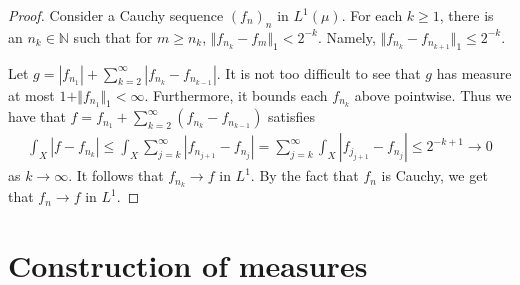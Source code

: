 \documentclass[11pt]{amsart}
\theoremstyle{definition}
\numberwithin{equation}{section}
\begin{document}
\begin{proof}
    Consider a Cauchy sequence $(f_n)_n$ in $L^1(\mu)$. For each $k\ge 1$, there is an $n_k\in\mathbb N$ such that for $m\ge n_k$, $\Vert f_{n_k}-f_m\Vert_1<2^{-k}$. Namely, $\Vert f_{n_k}-f_{n_{k+1}}\Vert_1\le2^{-k}$.

    Let $g=|f_{n_1}|+\sum_{k=2}^\infty|f_{n_k}-f_{n_{k-1}}|$. It is not too difficult to see that $g$ has measure at most $1+\Vert f_{n_1}\Vert_1<\infty$. Furthermore, it bounds each $f_{n_k}$ above pointwise. Thus we have that $f=f_{n_1}+\sum_{k=2}^\infty(f_{n_k}-f_{n_{k-1}})$ satisfies
    \begin{align*}
        \int_X|f-f_{n_k}|\le\int_X\sum_{j=k}^\infty|f_{n_{j+1}}-f_{n_j}|=\sum_{j=k}^\infty\int_X|f_{j_{j+1}}-f_{n_j}|\le 2^{-k+1}\to0
    \end{align*}
    as $k\to\infty$. It follows that $f_{n_k}\to f$ in $L^1$. By the fact that $f_{n}$ is Cauchy, we get that $f_n\to f$ in $L^1$.
\end{proof}
\newpage
\section{Construction of measures}
\end{document}
